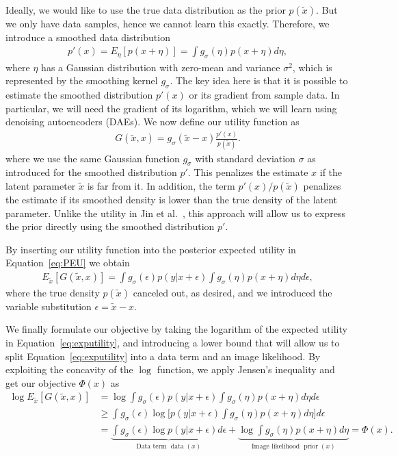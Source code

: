\documentclass{article}
\DeclareMathOperator*{\data}{data}
\DeclareMathOperator*{\prior}{prior}
\begin{document}
Ideally, we would like to use the true data distribution as the prior $p(\tilde{x})$. But we only have data samples, hence we cannot learn this exactly. Therefore, we introduce a smoothed data distribution 
\begin{align}
p'(x) = E_{\eta}[p(x+\eta)] = \int g_{\sigma}(\eta) p(x+\eta) d\eta,
\end{align}
where $\eta$ has a Gaussian distribution with zero-mean and variance $\sigma^2$, which is represented by the smoothing kernel $g_{\sigma}$. The key idea here is that it is possible to estimate the smoothed distribution $p'(x)$ or its gradient from sample data.
In particular, we will need the gradient of its logarithm, which 
we will learn using denoising autoencoders (DAEs). We now define our utility function as
\begin{align}
G(\tilde{x}, x) = g_{\sigma}(\tilde{x} - x) \frac{p'(x)}{p(\tilde{x})}.
\end{align}
where we use the same Gaussian function $g_{\sigma}$ with standard deviation $\sigma$ as introduced for the smoothed distribution $p'$. 
This penalizes the estimate $x$ if the latent parameter $\tilde{x}$ is far from it. In addition, the term ${p'(x)}/{p(\tilde{x})}$ penalizes the estimate if its smoothed density is lower than the true density of the latent parameter. 
Unlike the utility in Jin et al.~\cite{Jin:2017:NBD}, this approach will allow us to express the prior directly using the smoothed distribution $p'$.

By inserting our utility function into the posterior expected utility in Equation~\eqref{eq:PEU} we obtain
\begin{align}
E_{\tilde{x}}[G(\tilde{x},x)] = \int g_{\sigma}(\epsilon) p(y|x+\epsilon) \int g_{\sigma}(\eta) p(x+\eta)d\eta d\epsilon,
\label{eq:exputility}
\end{align}
where the true density $p(\tilde{x})$ canceled out, as desired, and we introduced the variable substitution $\epsilon = \tilde{x} - x$.


We finally formulate our objective by taking the logarithm of the expected utility in Equation~\eqref{eq:exputility}, and introducing a lower bound that will allow us to split Equation~\eqref{eq:exputility} into a data term and an image likelihood. By exploiting the concavity of the $\log$ function, we apply Jensen's inequality and get our objective $\Phi(x)$ as
\begin{align}
\log E_{\tilde{x}}[G(\tilde{x},x)] &= \log \int\!\! g_{\sigma}(\epsilon) p(y|x+\epsilon)\!\!\! \int\!\! g_{\sigma}(\eta) p(x+\eta) d\eta d\epsilon \nonumber \\
&\geq  \int\!\! g_{\sigma}(\epsilon) \log \Bigg[ p(y|x+\epsilon)\!\!\! \int\!\! g_{\sigma}(\eta) p(x+\eta) d\eta \Bigg] d\epsilon \nonumber \\
&= \underbrace{\int g_{\sigma}(\epsilon) \log p(y|x+\epsilon)d\epsilon}_{\text{Data term }\data(x)} + \underbrace{\log \int g_{\sigma}(\eta) p(x+\eta) d\eta}_{\text{Image likelihood }\prior(x)} = \Phi(x). \end{align}
\end{document}
